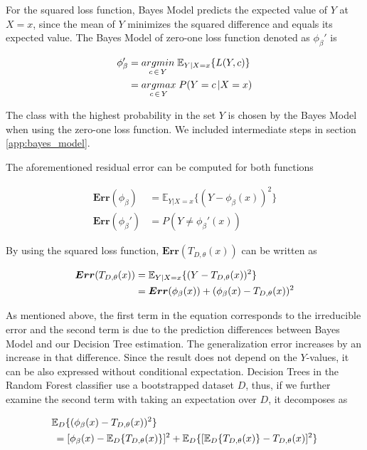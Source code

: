 For the squared loss function, Bayes Model predicts the expected value of $Y$ at $X=x$,
since the mean of $Y$ minimizes the squared difference 
and equals its expected value.
The Bayes Model of zero-one loss function denoted as $\phi_{\beta}'$ is

\begin{align}\label{eq:bayes_model}
\phi_{\beta}' & = \underset{c \,\in\, Y}{argmin} \; \mathbb{E}_{Y|X=x}\{L(Y,c) \} \notag\\
			 & = \underset{c \,\in\, Y}{argmax} \; P(Y = c \,| X = x)
\end{align}

The class with the highest probability in the set $Y$ is chosen by the Bayes Model when using the zero-one loss function.
We included intermediate steps in section \ref{app:bayes_model}. 

The aforementioned residual error can be computed for both functions

\begin{align}\label{eq:err_bayes}
\boldsymbol{Err}(\phi_{\beta}) & = \mathbb{E}_{Y|X=x}\{(Y-\phi_{\beta}(x))^2 \}\\
\boldsymbol{Err}(\phi_{\beta}') & = P(Y \neq \phi_{\beta}'(x) )
\end{align}

By using the squared loss function, $\boldsymbol{Err}(T_{D,\theta}(x))$ can be written as

\begin{align}\label{eq:decomp_squared_loss}
\boldsymbol{Err}(T_{D, \theta}(x)) & = \mathbb{E}_{Y|X=x}\{(Y-T_{D,\theta}(x))^2\} \notag \\
							   	  & = \boldsymbol{Err}(\phi_{\beta}(x)) + (\phi_{\beta}(x)-T_{D,\theta}(x))^2
\end{align}

As mentioned above, the first term in the equation corresponds to the 
irreducible error and the second term is due to the prediction differences between Bayes Model and our Decision Tree estimation. 
The generalization error increases by an increase in that difference. Since the result does not depend on the $Y$-values, 
it can be also expressed without conditional expectation. 
Decision Trees in the Random Forest classifier use a bootstrapped dataset $D$, thus, 
if we further examine the second term with taking an expectation over $D$, 
it decomposes as

\begin{align}\label{eq:decomp_squared_loss_cont}
	& \mathbb{E}_{D}\{(\phi_{\beta}(x) - T_{D,\theta}(x))^2 \} \notag \\
	& \: = [\phi_{\beta}(x) - \mathbb{E}_{D}\{T_{D,\theta}(x)\}]^2 + 
	\mathbb{E}_{D}\{[\mathbb{E}_{D}\{T_{D,\theta}(x)\} - T_{D,\theta}(x)]^2\}
\end{align}

